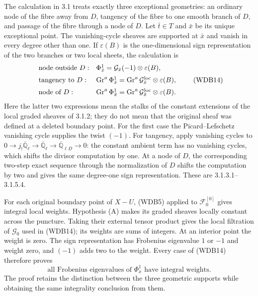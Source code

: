 The calculation in 3.1 treats exactly three exceptional geometries:
an ordinary node of the fibre away from \(D\), tangency of the fibre
to one smooth branch of \(D\), and passage of the fibre through a
node of \(D\). Let \(\bar t\in T\) and \(\bar x\) be its
unique exceptional point. The vanishing-cycle sheaves are supported
at \(\bar x\) and vanish in every degree other than one. If
\(\varepsilon(B)\) is the one-dimensional sign representation
of the two branches or two local sheets, the calculation is
\[
 \begin{array}{ll}
 \text{node outside }D:&
  \Phi^1_{\bar x}=\mathcal G_{\bar x}(-1)
                                  \otimes\varepsilon(B),\\[2mm]
 \text{tangency to }D:&
  \operatorname{Gr}^a\Phi^1_{\bar x}
      =\operatorname{Gr}^a\mathcal G_{\bar x}^{\rm loc}
                                  \otimes\varepsilon(B),\\[2mm]
 \text{node of }D:&
  \operatorname{Gr}^a\Phi^1_{\bar x}
      =\operatorname{Gr}^a\mathcal G_{\bar x}^{\rm loc}
                                  \otimes\varepsilon(B).
 \end{array}
 \tag{WDB14}
\]
Here the latter two expressions mean the stalks of the constant
extensions of the local graded sheaves of 3.1.2; they do not mean
that the original sheaf was defined at a deleted boundary point.
For the first case the Picard--Lefschetz vanishing cycle supplies
the twist \((-1)\). For tangency, apply vanishing cycles to
\(0\to j_!\overline{\mathbb Q}_\ell\to
\overline{\mathbb Q}_\ell\to
\overline{\mathbb Q}_{\ell D}\to0\): the constant ambient
term has no vanishing cycles, which shifts the divisor computation
by one. At a node of \(D\), the corresponding two-step exact
sequence through the normalization of \(D\) shifts the computation
by two and gives the same degree-one sign representation. These are
3.1.3.1--3.1.5.4.

For each original boundary point of \(X-U\), (WDB5) applied to
\(\mathcal F_0^{[0]}\) gives integral local weights. Hypothesis
(A) makes its graded sheaves locally constant across the puncture.
Taking their external tensor product gives the local filtration of
\(\mathcal G_0\) used in (WDB14); its weights are sums of
integers. At an interior point the weight is zero. The sign
representation has Frobenius eigenvalue \(1\) or \(-1\) and
weight zero, and \((-1)\) adds two to the weight. Every case of
(WDB14) therefore proves
\[
 \text{all Frobenius eigenvalues of }\Phi^1_{\bar x}
 \text{ have integral weights.}
 \tag{WDB15}
\]
The proof retains the distinction between the three geometric
supports while obtaining the same integrality conclusion from them.

